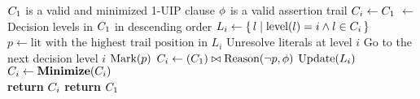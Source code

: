 \begin{algorithm}[t]
\caption{\IUIP}\label{alg:i-uip}
\begin{algorithmic}[1]
\Require  $C_{1}$ is a valid and minimized 1-UIP clause
\Require  $\phi$ is a valid assertion trail
\Procedure{\IUIP}{$\oneUIPClause, \assertionTrail$} 
    \State $C_{i} \gets C_{1} $  \label{ln:init}
    \State {} $\gets$ Decision levels in $C_{1}$ in descending order
 \label{ln:iterDecisionLvls}
    \State $L_{i} \gets \{\,l\mid\text{level}(l) = i \wedge l \in C_{i}\,\}$
     \label{ln:uip}
        \State $p \gets \text{lit with the highest trail position in } L_{i} $ \label{ln:trailaccess}
         \label{ln:resolvable}
            \If{$\IUIPPURE$}
                \State Unresolve literals at level $i$  \label{ln:unresolve}
                \State Go to the next decision level $i$ \label{ln:abondon}
            \ElsIf{$\IUIPMIN$}
                \State $\text{Mark}(p)$ \label{ln:mark}
            \EndIf
        \Else 
            \State  $C_{i} \gets (C_{1} ) \bowtie \text{Reason}(\neg{p}, \phi)$
           \State  $\text{Update}(L_{i})$
        \EndIf
    \EndWhile
\EndFor \label{ln:endCompleteResolution}
\\
\If{$\IUIPPURE$}\label{ln: 2ndMinStart}   
    \State $C_{i}  \gets \textbf{Minimize}(C_{i})$ 
\EndIf\label{ln: 2ndMinEnd}
\\
\If{$|\iUIPClause| < |\oneUIPClause|$} \label{ln:checkSize}
    \State \textbf{return} $C_{i}$
\Else
    \State \textbf{return} $C_{1}$
\EndIf  \label{ln:cSizeCheck}
\EndProcedure
\end{algorithmic}
\end{algorithm}

